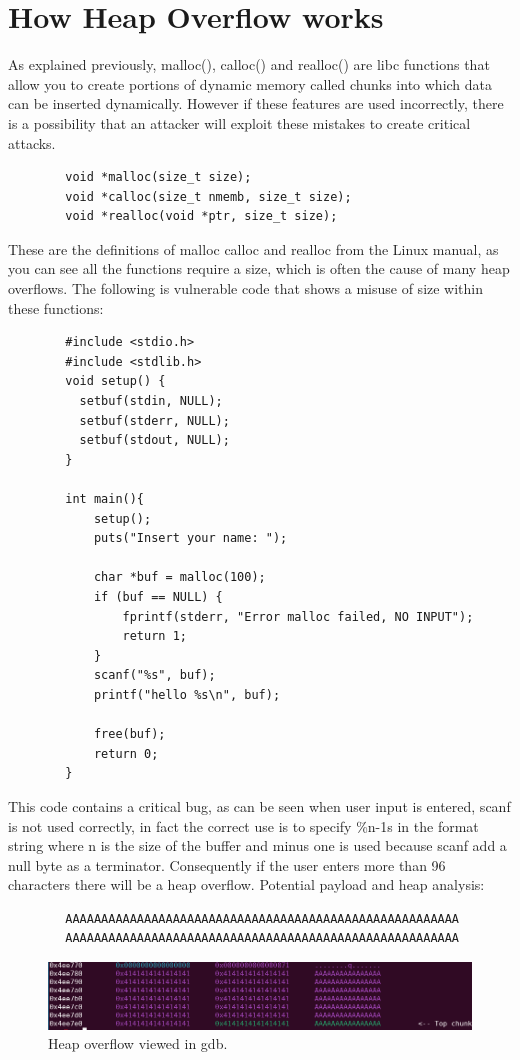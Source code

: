     \section{How Heap Overflow works}
    As explained previously, malloc(), calloc() and realloc() are libc functions that allow you to create portions of dynamic memory called chunks into which data can be inserted dynamically.
    However if these features are used incorrectly, there is a possibility that an attacker will exploit these mistakes to create critical attacks.
    \begin{verbatim}
        void *malloc(size_t size);
        void *calloc(size_t nmemb, size_t size);
        void *realloc(void *ptr, size_t size);
    \end{verbatim}
    These are the definitions of malloc calloc and realloc from the Linux manual, as you can see all the functions require a size, which is often the cause of many heap overflows.
    The following is vulnerable code that shows a misuse of size within these functions:
    \begin{verbatim}
        #include <stdio.h>
        #include <stdlib.h>
        void setup() {
          setbuf(stdin, NULL);
          setbuf(stderr, NULL);
          setbuf(stdout, NULL);
        }
        
        int main(){
            setup();
            puts("Insert your name: ");
        
            char *buf = malloc(100);
            if (buf == NULL) {
                fprintf(stderr, "Error malloc failed, NO INPUT");
                return 1;
            }
            scanf("%s", buf);
            printf("hello %s\n", buf);
        
            free(buf);
            return 0;
        }
    \end{verbatim}
    This code contains a critical bug, as can be seen when user input is entered, scanf is not used correctly, in fact the correct use is to specify \%n-1s in the format string where n is the size of the buffer and minus one is used because scanf add a null byte as a terminator.
    Consequently if the user enters more than 96 characters there will be a heap overflow.\newline
    Potential payload and heap analysis:
    \begin{verbatim}
        AAAAAAAAAAAAAAAAAAAAAAAAAAAAAAAAAAAAAAAAAAAAAAAAAAAAAAA
        AAAAAAAAAAAAAAAAAAAAAAAAAAAAAAAAAAAAAAAAAAAAAAAAAAAAAAA
    \end{verbatim}
        \begin{figure}[htbp]
        \centering
        \includegraphics[width=1\linewidth]{Images/heap_overflow.png}
        \caption{Heap overflow viewed in gdb.}
        \label{fig:enter-label}
    \end{figure}
